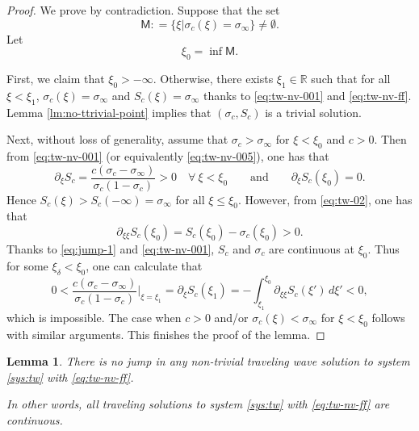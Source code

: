 \documentclass[12pt]{article}
\newtheorem{lemma}[theorem]{Lemma}
\theoremstyle{definition}
\theoremstyle{remark}
\numberwithin{equation}{section}
\begin{document}
\begin{proof}
    We prove by contradiction. Suppose that the set 
    \begin{equation}
        \label{001-tw-nv}
        \mathsf M: = \lbrace \xi \vert \sigma_c(\xi) = \sigma_\infty \rbrace \neq \emptyset. 
    \end{equation}
    Let 
    \begin{equation}
        \label{002-tw-nv}
        \xi_0 = \inf \mathsf M. 
    \end{equation}
    
    First, we claim that $ \xi_0 > -\infty $. Otherwise, there exists $ \xi_1 \in \mathbb R $ such that for all $ \xi < \xi_1 $,  $ \sigma_c (\xi) = \sigma_\infty $ and $ S_c (\xi) = \sigma_\infty $ thanks to \eqref{eq:tw-nv-001} and \eqref{eq:tw-nv-ff}. Lemma \ref{lm:no-ttrivial-point} implies that $ (\sigma_c,S_c) $ is a trivial solution. 
    
    Next, without loss of generality, assume that $ \sigma_c > \sigma_\infty $ for $ \xi < \xi_0 $ and $ c > 0 $. Then from \eqref{eq:tw-nv-001} (or equivalently \eqref{eq:tw-nv-005}), one has that
    \begin{equation}
        \label{003-tw-nv}
        \partial_\xi S_c = \frac{c (\sigma_c - \sigma_\infty)}{\sigma_c (1-\sigma_c)} > 0 \quad \forall \ \xi < \xi_0 \qquad \text{and} \qquad  \partial_\xi S_c(\xi_0) = 0.
    \end{equation}
    Hence $ S_c(\xi) > S_c(-\infty) = \sigma_\infty $ for all $ \xi \leq  \xi_0 $. However, from \eqref{eq:tw-02}, one has that
    \begin{equation}
    \label{004-tw-nv}
        \partial_{\xi\xi} S_c (\xi_0) = S_c(\xi_0) - \sigma_c(\xi_0) > 0.
    \end{equation}
    Thanks to \eqref{eq:jump-1} and \eqref{eq:tw-nv-001}, $ S_c $ and $ \sigma_c $ are continuous at $ \xi_0 $. Thus for some $ \xi_\delta < \xi_0 $, one can calculate that
    \begin{equation}
         0 < \frac{c (\sigma_c - \sigma_\infty)}{\sigma_c (1-\sigma_c)}\Big\vert_{\xi = \xi_1} = \partial_\xi S_c(\xi_1) = - \int_{\xi_1}^{\xi_0} \partial_{\xi\xi} S_c(\xi') \, d\xi' < 0,
    \end{equation}
    which is impossible.
    The case when $ c > 0 $ and/or $ \sigma_c(\xi) < \sigma_\infty $ for $\xi< \xi_0 $ follows with similar arguments. 
    This finishes the proof of the lemma. 
\end{proof}

\begin{lemma}
    \label{lm:no-jump-tw-nv}
    There is no jump in any non-trivial traveling wave solution to system \eqref{sys:tw} with \eqref{eq:tw-nv-ff}.

    In other words, all traveling solutions to system \eqref{sys:tw} with \eqref{eq:tw-nv-ff} are continuous.
\end{lemma}
\end{document}
